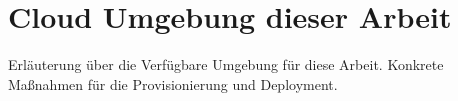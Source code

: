 \section{Cloud Umgebung dieser Arbeit}

Erläuterung über die Verfügbare Umgebung für diese Arbeit.
Konkrete Maßnahmen für die Provisionierung und Deployment.




